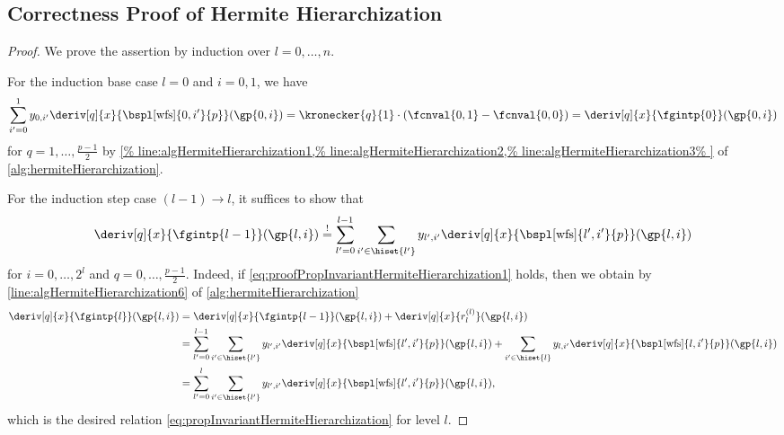 \subsection{Correctness Proof of Hermite Hierarchization}
\label{sec:proofHermiteHierarchization}

\propInvariantHermiteHierarchization*

\begin{proof}
  We prove the assertion by induction over $l = 0, \dotsc, n$.
  
  For the induction base case $l = 0$ and $i = 0, 1$, we have
  \begin{equation}
    \sum_{i'=0}^1
    \linout{0,i'} \deriv[q]{x}{\bspl[\wfs]{0,i'}{p}}(\gp{0,i})
    = \kronecker{q}{1} \cdot (\fcnval{0,1} - \fcnval{0,0})
    = \deriv[q]{x}{\fgintp{0}}(\gp{0,i})
  \end{equation}
  for $q = 1, \dotsc, \frac{p-1}{2}$ by
  \cref{%
    line:algHermiteHierarchization1,%
    line:algHermiteHierarchization2,%
    line:algHermiteHierarchization3%
  }
  of \cref{alg:hermiteHierarchization}.
  
  For the induction step case $(l-1) \to l$,
  it suffices to show that
  \begin{equation}
    \label{eq:proofPropInvariantHermiteHierarchization1}
    \deriv[q]{x}{\fgintp{l-1}}(\gp{l,i})
    \overset{!}{=} \sum_{l'=0}^{l-1} \sum_{i' \in \hiset{l'}}
    \linout{l',i'} \deriv[q]{x}{\bspl[\wfs]{l',i'}{p}}(\gp{l,i})
  \end{equation}
  for $i = 0, \dotsc, 2^l$ and $q = 0, \dotsc, \frac{p-1}{2}$.
  Indeed, if \eqref{eq:proofPropInvariantHermiteHierarchization1} holds,
  then we obtain by \cref{line:algHermiteHierarchization6}
  of \cref{alg:hermiteHierarchization}
  \begin{subequations}
    \begin{align}
      \deriv[q]{x}{\fgintp{l}}(\gp{l,i})
      &= \deriv[q]{x}{\fgintp{l-1}}(\gp{l,i}) +
      \deriv[q]{x}{r^{(l)}_l}(\gp{l,i})\\
      &= \sum_{l'=0}^{l-1} \sum_{i' \in \hiset{l'}}
      \linout{l',i'} \deriv[q]{x}{\bspl[\wfs]{l',i'}{p}}(\gp{l,i}) +
      \sum_{i' \in \hiset{l}}
      \linout{l,i'} \deriv[q]{x}{\bspl[\wfs]{l,i'}{p}}(\gp{l,i})\\
      &= \sum_{l'=0}^l \sum_{i' \in \hiset{l'}}
      \linout{l',i'} \deriv[q]{x}{\bspl[\wfs]{l',i'}{p}}(\gp{l,i}),
    \end{align}
  \end{subequations}
  which is the desired relation
  \eqref{eq:propInvariantHermiteHierarchization}
  for level $l$.
  

\end{proof}
